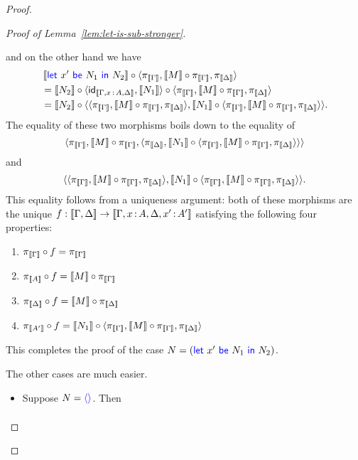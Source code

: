 \begin{proof}
\begin{proof}[Proof of Lemma~\ref{lem:let-is-sub-stronger}]
\begin{itemize}
      and on the other hand we have
      \begin{align*}
        &\llbr{\pllet{x'}{N_1}{N_2}} \circ \angled{\pi_{\llbr{\Gamma}}, \llbr{M} \circ \pi_{\llbr{\Gamma}}, \pi_{\llbr{\Delta}}}
        \\
        &=\llbr{N_2} \circ \angled{\idt_{\llbr{\Gamma,x\ofty A,\Delta}}, \llbr{N_1}} \circ \angled{\pi_{\llbr{\Gamma}}, \llbr{M} \circ \pi_{\llbr{\Gamma}}, \pi_{\llbr{\Delta}}}
        \\
        &=\llbr{N_2} \circ \angled{\angled{\pi_{\llbr{\Gamma}}, \llbr{M} \circ \pi_{\llbr{\Gamma}}, \pi_{\llbr{\Delta}}}, \llbr{N_1}\circ\angled{\pi_{\llbr{\Gamma}}, \llbr{M} \circ \pi_{\llbr{\Gamma}}, \pi_{\llbr{\Delta}}}}.
      \end{align*}
      The equality of these two morphisms boils down to the equality of
      \[
\angled{\pi_{\llbr{\Gamma}},\llbr{M}\circ \pi_{\llbr{\Gamma}},\angled{\pi_{\llbr{\Delta}}, \llbr{N_1}
          \circ \angled{
            \pi_{\llbr{\Gamma}},
            \llbr{M} \circ \pi_{\llbr{\Gamma}},
            \pi_{\llbr{\Delta}}
            }}}
      \]
      and
      \[
\angled{\angled{\pi_{\llbr{\Gamma}}, \llbr{M} \circ \pi_{\llbr{\Gamma}}, \pi_{\llbr{\Delta}}}, \llbr{N_1}\circ\angled{\pi_{\llbr{\Gamma}}, \llbr{M} \circ \pi_{\llbr{\Gamma}}, \pi_{\llbr{\Delta}}}}.
      \]
      This equality follows from a uniqueness argument:
      both of these morphisms are the unique \(f : \llbr{\Gamma,\Delta} \to \llbr{\Gamma,x\ofty A,\Delta,x'\ofty A'}\)
      satisfying the following four properties:
      \begin{enumerate}
        \item \(\pi_{\llbr{\Gamma}} \circ f = \pi_{\llbr{\Gamma}}\)
        \item \(\pi_{\llbr{A}} \circ f = \llbr{M} \circ \pi_{\llbr{\Gamma}}\)
        \item \(\pi_{\llbr{\Delta}} \circ f = \llbr{M} \circ \pi_{\llbr{\Delta}}\)
        \item \(\pi_{\llbr{A'}} \circ f =  \llbr{N_1}\circ\angled{\pi_{\llbr{\Gamma}}, \llbr{M} \circ \pi_{\llbr{\Gamma}}, \pi_{\llbr{\Delta}}}\)
      \end{enumerate}
      This completes the proof of
      the case \(N = (\pllet{x'}{N_1}{N_2})\).
    \end{itemize}
    The other cases are much easier.
    \begin{itemize}
    \item Suppose \(N = \plunit\). Then
      \begin{align*}

\end{align*}
\end{itemize}
\end{proof}
\end{proof}
